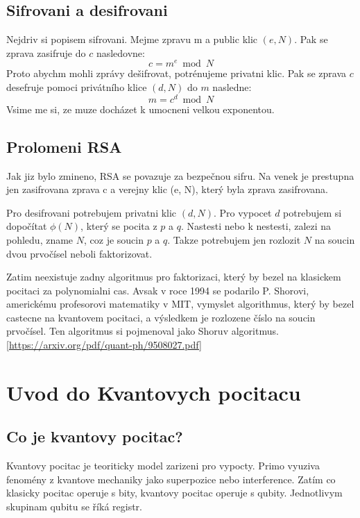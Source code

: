 \documentclass[12pt]{article}
\begin{document}
\subsection{Sifrovani a desifrovani}
Nejdriv si popisem sifrovani.
Mejme zpravu m a public klic $(e, N)$. Pak se zprava zasifruje do $c$ nasledovne:
$$c = m^e \bmod N$$
Proto abychm mohli zprávy dešifrovat, potrénujeme privatni klic. Pak se zprava $c$ desefruje pomoci privátního klice $(d, N)$ do $m$ nasledne:
$$m = c^d \bmod N$$
Vsime me si, ze muze docházet k umocneni velkou exponentou.

\subsection{Prolomeni RSA}
Jak jiz bylo zmineno, RSA se povazuje za bezpečnou sifru. Na venek je prestupna jen zasifrovana zprava c a verejny klic (e, N), který byla zprava zasifrovana.

\par Pro desifrovani potrebujem privatni klic $(d, N)$.
Pro vypocet $d$ potrebujem si dopočítat $\phi (N)$, který se pocita z $p$ a $q$.
Nastesti nebo k nestesti, zalezi na pohledu, zname $N$, coz je soucin $p$ a $q$.
Takze potrebujem jen rozlozit $N$ na soucin dvou prvočísel neboli faktorizovat.

\par Zatim neexistuje zadny algoritmus pro faktorizaci, který by bezel na klasickem pocitaci za polynomialni cas.
Avsak v roce 1994 se podarilo P. Shorovi, americkému profesorovi matematiky v MIT, vymyslet algorithmus, který by bezel castecne na kvantovem pocitaci, a výsledkem je rozlozene číslo na soucin prvočísel.
Ten algoritmus si pojmenoval jako Shoruv algoritmus.[\url{https://arxiv.org/pdf/quant-ph/9508027.pdf}]


\newpage

\section{Uvod do Kvantovych pocitacu}
\subsection{Co je kvantovy pocitac?}
Kvantovy pocitac je teoriticky model zarizeni pro vypocty.
Primo vyuziva fenomény z kvantove mechaniky jako superpozice nebo interference.
Zatím co klasicky pocitac operuje s bity, kvantovy pocitac operuje s qubity.
Jednotlivym skupinam qubitu se říká registr.
\end{document}
